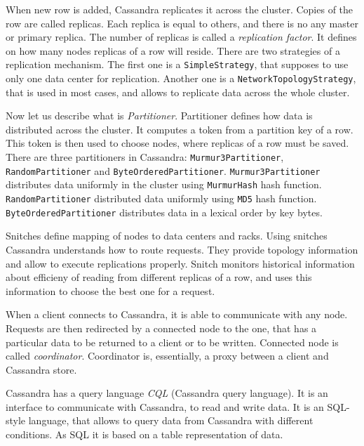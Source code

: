 When new row is added, Cassandra replicates it across the cluster.
Copies of the row are called replicas.
Each replica is equal to others, and there is no any master or primary replica.
The number of replicas is called a \textit{replication factor}.
It defines on how many nodes replicas of a row will reside.
There are two strategies of a replication mechanism.
The first one is a \lstinline{SimpleStrategy}, that supposes to use only one data center for replication.
Another one is a \lstinline{NetworkTopologyStrategy}, that is used in most cases, and allows to replicate data across the whole cluster.

Now let us describe what is \textit{Partitioner}.
Partitioner defines how data is distributed across the cluster.
It computes a token from a partition key of a row.
This token is then used to choose nodes, where replicas of a row must be saved.
There are three partitioners in Cassandra: \lstinline{Murmur3Partitioner}, \lstinline{RandomPartitioner} and \lstinline{ByteOrderedPartitioner}.
\lstinline{Murmur3Partitioner} distributes data uniformly in the cluster using \lstinline{MurmurHash} hash function.
\lstinline{RandomPartitioner} distributed data uniformly using \lstinline{MD5} hash function.
\lstinline{ByteOrderedPartitioner} distributes data in a lexical order by key bytes.

Snitches define mapping of nodes to data centers and racks.
Using snitches Cassandra understands how to route requests.
They provide topology information and allow to execute replications properly.
Snitch monitors historical information about efficieny of reading from different replicas of a row, and uses this information to choose the best one for a request.

When a client connects to Cassandra, it is able to communicate with any node. 
Requests are then redirected by a connected node to the one, that has a particular data to be returned to a client or to be written.
Connected node is called \textit{coordinator}.
Coordinator is, essentially, a proxy between a client and Cassandra store.

Cassandra has a query language \textit{CQL} (Cassandra query language).
It is an interface to communicate with Cassandra, to read and write data.
It is an SQL-style language, that allows to query data from Cassandra with different conditions.
As SQL it is based on a table representation of data.
